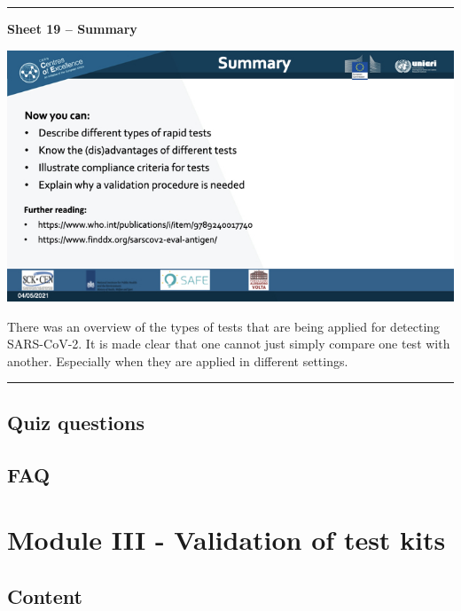 \documentclass[
]{book}
\begin{document}
\begin{center}\rule{0.5\linewidth}{0.5pt}\end{center}

\textbf{Sheet 19 -- Summary}

\includegraphics{images/m02/m02_types_of_rapid_tests_final.019.jpeg}

There was an overview of the types of tests that are being applied for
detecting SARS-CoV-2. It is made clear that one cannot just simply
compare one test with another. Especially when they are applied in
different settings.

\begin{center}\rule{0.5\linewidth}{0.5pt}\end{center}

\hypertarget{quiz-questions}{%
\subsection{Quiz questions}\label{quiz-questions}}

\hypertarget{faq}{%
\subsection{FAQ}\label{faq}}

\hypertarget{module-iii---validation-of-test-kits}{%
\section{Module III - Validation of test kits}\label{module-iii---validation-of-test-kits}}

\hypertarget{content-1}{%
\subsection{Content}\label{content-1}}
\end{document}
